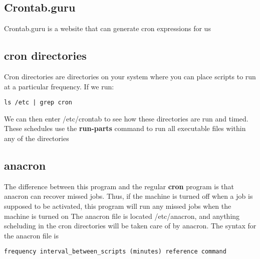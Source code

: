 \documentclass{report}
\begin{document}
    \bigbreak \noindent 
    \subsection{Crontab.guru}
    \bigbreak \noindent 
    Crontab.guru is a website that can generate cron expressions for us

    \bigbreak \noindent 
    \subsection{cron directories}
    \bigbreak \noindent 
    \begin{concept}
        Cron directories are directories on your system where you can place scripts to run at a particular frequency. If we run:
    \end{concept}
    \bigbreak \noindent 
    \begin{verbatim}
ls /etc | grep cron
    \end{verbatim}
    \bigbreak \noindent
    We can then enter /etc/crontab to see how these directories are run and timed. These schedules use the \textbf{run-parts} command to run all executable files within any of the directories 

    \bigbreak \noindent 
    \subsection{anacron}
    \bigbreak \noindent 
    The difference between this program and the regular \textbf{cron} program is that anacron can recover missed jobs. Thus, if the machine is turned off when a job is supposed to be activated, this program will run any missed jobs when the machine is turned on 
    \bigbreak \noindent 
    The anacron file is located /etc/anacron, and anything scheluding in the cron directories will be taken care of by anacron. The syntax for the anacron file is 
    \bigbreak \noindent
\begin{verbatim}
frequency interval_between_scripts (minutes) reference command
\end{verbatim}
\bigbreak \noindent
    
    \pagebreak \bigbreak \noindent 

    
    




    





  




  




    

    





    
\end{document}
